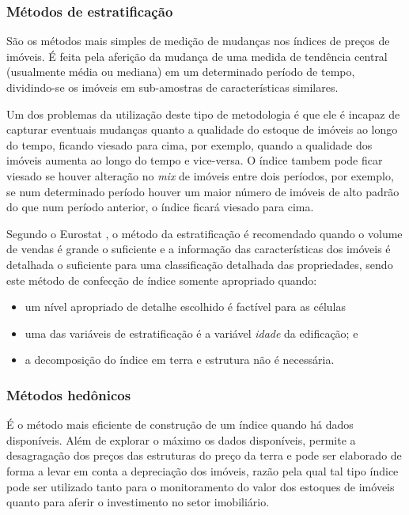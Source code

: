 \documentclass[
	12pt,				%
	oneside,			%
	a4paper,			%
	chapter=TITLE,		%
	section=TITLE,		%
	english,			%
	brazil				%
	]{abntex2}
\begin{document}
\hypertarget{muxe9todos-de-estratificauxe7uxe3o}{%
\subsubsection{Métodos de estratificação}\label{muxe9todos-de-estratificauxe7uxe3o}}

São os métodos mais simples de medição de mudanças nos índices de preços de
imóveis. É feita pela aferição da mudança de uma medida de tendência central
(usualmente média ou mediana) em um determinado período de tempo, dividindo-se
os imóveis em sub-amostras de características similares.

Um dos problemas da utilização deste tipo de metodologia é que ele é incapaz
de capturar eventuais mudanças quanto a qualidade do estoque de imóveis ao longo
do tempo, ficando viesado para cima, por exemplo, quando a qualidade dos imóveis
aumenta ao longo do tempo e vice-versa. O índice tambem pode ficar viesado se
houver alteração no \emph{mix} de imóveis entre dois períodos, por exemplo, se num
determinado período houver um maior número de imóveis de alto padrão do que
num período anterior, o índice ficará viesado para cima.

Segundo o Eurostat \autocite*[158]{rppi}, o método da estratificação é recomendado quando o
volume de vendas é grande o suficiente e a informação das características dos
imóveis é detalhada o suficiente para uma classificação detalhada das
propriedades, sendo este método de confecção de índice somente apropriado quando:
\begin{itemize}
\tightlist
\item
  um nível apropriado de detalhe escolhido é factível para as células
\item
  uma das variáveis de estratificação é a variável \emph{idade} da edificação; e
\item
  a decomposição do índice em terra e estrutura não é necessária.
\end{itemize}
\hypertarget{muxe9todos-heduxf4nicos}{%
\subsubsection{Métodos hedônicos}\label{muxe9todos-heduxf4nicos}}

É o método mais eficiente de construção de um índice quando há dados
disponíveis. Além de explorar o máximo os dados disponíveis, permite a
desagragação dos preços das estruturas do preço da terra e pode ser elaborado de
forma a levar em conta a depreciação dos imóveis, razão pela qual tal tipo
índice pode ser utilizado tanto para o monitoramento do valor dos estoques de
imóveis quanto para aferir o investimento no setor imobiliário.
\end{document}
